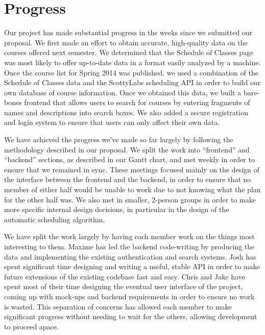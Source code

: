 \section{Progress}

Our project has made substantial progress in the weeks since we submitted our proposal.
We first made an effort to obtain accurate, high-quality data on the courses offered next semester.
We determined that the Schedule of Classes page was most likely to offer up-to-date data in a 
format easily analyzed by a machine. Once the course list for Spring 2014 was published, we used
a combination of the Schedule of Classes data and the ScottyLabs scheduling API in order to build
our own database of course information. Once we obtained this data, we built a bare-bones frontend
that allows users to search for courses by entering fragments of names and descriptions into search
boxes. We also added a secure registration and login system to ensure that users can only affect
their own data.

We have achieved the progress we've made so far largely by following the methodology described in 
our proposal. We split the work into ``frontend'' and ``backend'' sections, as described in our
Gantt chart, and met weekly in order to ensure that we remained in sync. These meetings focused
mainly on the design of the interface between the frontend and the backend, in order to ensure
that no member of either half would be unable to work due to not knowing what the plan for the
other half was. We also met in smaller, 2-person groups in order to make more specific internal
design decisions, in particular in the design of the automatic scheduling algorithm.

We have split the work largely by having each member work on the things most interesting to them.
Maxime has led the backend code-writing by producing the data and implementing the existing
authentication and search systems. Josh has spent significant time designing and writing a
useful, stable API in order to make future extensions of the existing codebase fast and easy.
Chris and Jake have spent most of their time designing the eventual user interface of the project,
coming up with mock-ups and backend requirements in order to ensure no work is wasted. This separation
of concerns has allowed each member to make significant progress without needing to wait for
the others, allowing development to proceed apace.
